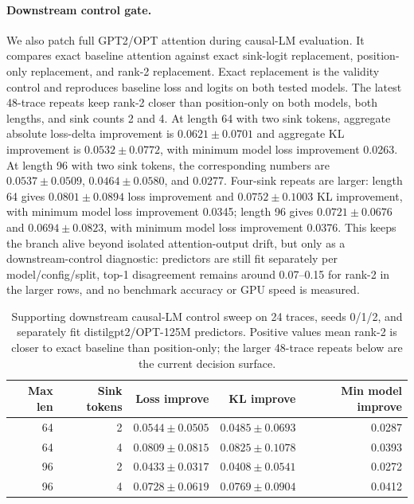 \documentclass{article}
\begin{document}
\paragraph{Downstream control gate.}
We also patch full GPT2/OPT attention during causal-LM
evaluation. It compares exact baseline attention against exact sink-logit
replacement, position-only replacement, and rank-2 replacement. Exact
replacement is the validity control and reproduces baseline loss and logits on
both tested models. The latest 48-trace repeats keep rank-2 closer than
position-only on both models, both lengths, and sink counts 2 and 4. At length
64 with two sink tokens, aggregate absolute loss-delta improvement is
$0.0621 \pm 0.0701$ and aggregate KL improvement is $0.0532 \pm 0.0772$, with
minimum model loss improvement 0.0263. At length 96 with two sink tokens, the
corresponding numbers are $0.0537 \pm 0.0509$, $0.0464 \pm 0.0580$, and
0.0277. Four-sink repeats are larger: length 64 gives $0.0801 \pm 0.0894$
loss improvement and $0.0752 \pm 0.1003$ KL improvement, with minimum model
loss improvement 0.0345; length 96 gives $0.0721 \pm 0.0676$ and
$0.0694 \pm 0.0823$, with minimum model loss improvement 0.0376. This keeps
the branch alive beyond isolated attention-output drift, but only as a
downstream-control diagnostic: predictors are still fit separately per
model/config/split, top-1 disagreement remains around 0.07--0.15 for rank-2 in
the larger rows, and no benchmark accuracy or GPU speed is measured.

\begin{table}[h]
\centering
\small
\begin{tabular}{rrrrr}
\toprule
Max len & Sink tokens & Loss improve & KL improve & Min model improve \\
\midrule
64 & 2 & $0.0544 \pm 0.0505$ & $0.0485 \pm 0.0693$ & 0.0287 \\
64 & 4 & $0.0809 \pm 0.0815$ & $0.0825 \pm 0.1078$ & 0.0393 \\
96 & 2 & $0.0433 \pm 0.0317$ & $0.0408 \pm 0.0541$ & 0.0272 \\
96 & 4 & $0.0728 \pm 0.0619$ & $0.0769 \pm 0.0904$ & 0.0412 \\
\bottomrule
\end{tabular}
\caption{Supporting downstream causal-LM control sweep on 24 traces, seeds 0/1/2, and separately fit distilgpt2/OPT-125M predictors. Positive values mean rank-2 is closer to exact baseline than position-only; the larger 48-trace repeats below are the current decision surface.}
\end{table}
\end{document}
